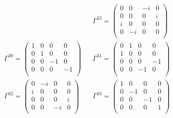 \begin{align*}
    &&
    \Gamma^{23} = 
    \begin{pmatrix}
    0  &  0  &  -i  &  0  \\
    0  &  0  &  0  &  i  \\
    i  &  0  &  0  &  0  \\
    0  &  -i  &  0  &  0  \\
    \end{pmatrix}
    \\
    \Gamma^{30} = 
    \begin{pmatrix}
    1  &  0  &  0  &  0  \\
    0  &  1  &  0  &  0  \\
    0  &  0  &  -1  &  0  \\
    0  &  0  &  0  &  -1  \\
    \end{pmatrix}
    &&
    \Gamma^{31} = 
    \begin{pmatrix}
    0  &  1  &  0  &  0  \\
    1  &  0  &  0  &  0  \\
    0  &  0  &  0  &  -1  \\
    0  &  0  &  -1  &  0  \\
    \end{pmatrix}
    \\
    \Gamma^{32} = 
    \begin{pmatrix}
    0  &  -i  &  0  &  0  \\
    i  &  0  &  0  &  0  \\
    0  &  0  &  0  &  i  \\
    0  &  0  &  -i  &  0  \\
    \end{pmatrix}
    &&
    \Gamma^{33} = 
    \begin{pmatrix}
    1  &  0  &  0  &  0  \\
    0  &  -1  &  0  &  0  \\
    0  &  0  &  -1  &  0  \\
    0  &  0  &  0  &  1  \\
    \end{pmatrix}
\end{align*}

\newpage
